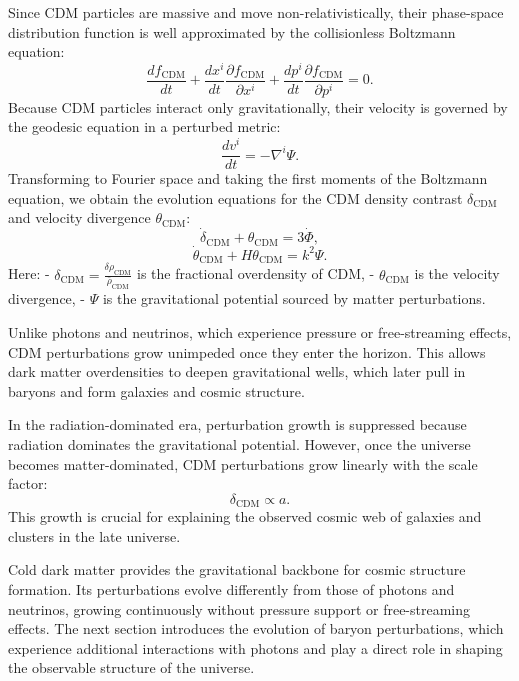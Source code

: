 \documentclass{aa}
\begin{document}
Since CDM particles are massive and move non-relativistically, their phase-space distribution function is well approximated by the collisionless Boltzmann equation:
\begin{equation}
\frac{df_{\text{CDM}}}{dt} + \frac{dx^i}{dt} \frac{\partial f_{\text{CDM}}}{\partial x^i} + \frac{d p^i}{dt} \frac{\partial f_{\text{CDM}}}{\partial p^i} = 0.
\end{equation}
Because CDM particles interact only gravitationally, their velocity is governed by the geodesic equation in a perturbed metric:
\begin{equation}
\frac{d v^i}{dt} = -\nabla^i \Psi.
\end{equation}
Transforming to Fourier space and taking the first moments of the Boltzmann equation, we obtain the evolution equations for the CDM density contrast $\delta_{\text{CDM}}$ and velocity divergence $\theta_{\text{CDM}}$:
\begin{equation}
\dot{\delta}_{\text{CDM}} + \theta_{\text{CDM}} = 3 \dot{\Phi},
\end{equation}\begin{equation}
\dot{\theta}_{\text{CDM}} + H \theta_{\text{CDM}} = k^2 \Psi.
\end{equation}
Here:
- $\delta_{\text{CDM}} = \frac{\delta\rho_{\text{CDM}}}{\bar{\rho}_{\text{CDM}}}$ is the fractional overdensity of CDM,
- $\theta_{\text{CDM}}$ is the velocity divergence,
- $\Psi$ is the gravitational potential sourced by matter perturbations.

Unlike photons and neutrinos, which experience pressure or free-streaming effects, CDM perturbations grow unimpeded once they enter the horizon. This allows dark matter overdensities to deepen gravitational wells, which later pull in baryons and form galaxies and cosmic structure.

In the radiation-dominated era, perturbation growth is suppressed because radiation dominates the gravitational potential. However, once the universe becomes matter-dominated, CDM perturbations grow linearly with the scale factor:
\begin{equation}
\delta_{\text{CDM}} \propto a.
\end{equation}
This growth is crucial for explaining the observed cosmic web of galaxies and clusters in the late universe.

Cold dark matter provides the gravitational backbone for cosmic structure formation. Its perturbations evolve differently from those of photons and neutrinos, growing continuously without pressure support or free-streaming effects. The next section introduces the evolution of baryon perturbations, which experience additional interactions with photons and play a direct role in shaping the observable structure of the universe.
\color{black}
\end{document}
